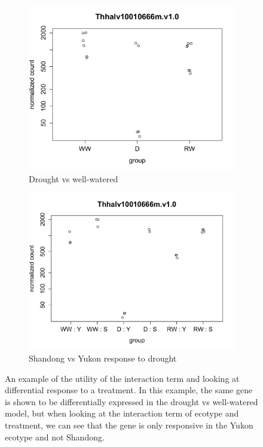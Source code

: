 \documentclass[12pt]{article}
\begin{document}
	\begin{figure}[H]
		\centering
		\begin{subfigure}[b]{1\textwidth}
			\centering
			\includegraphics[trim=1cm 0 0 0,scale=0.5]{../figures/dww_plot.pdf}
			\caption{Drought vs well-watered}
		\end{subfigure}
		\begin{subfigure}[b]{1\textwidth}
			\centering
			\includegraphics[trim=1cm 0 0 0,scale=0.5]{../figures/sy_d_plot.pdf}
			\caption{Shandong vs Yukon response to drought}
		\end{subfigure}	
		\caption[Expression response plots]{An example of the utility of the interaction term and looking at differential response to a treatment. In this example, the same gene is shown to be differentially expressed in the drought vs well-watered model, but when looking at the interaction term of ecotype and treatment, we can see that the gene is only responsive in the Yukon ecotype and not Shandong.}
		\label{count_plot_example}	
	\end{figure}
		
\end{document}
